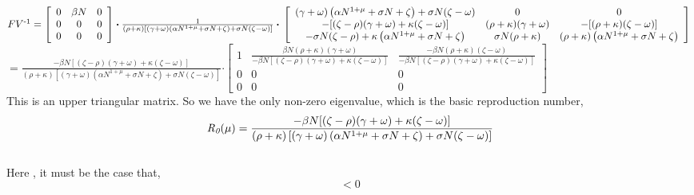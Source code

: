 $
FV\textsuperscript{-1} = \left[\begin{array}{ccc}
0 & \beta N & 0 \\
0 & 0 & 0 \\
0 & 0 & 0
\end{array}\right] \boldsymbol{\cdot} \frac{1}{(\rho+\kappa)\left[(\gamma+\omega)\left(\alpha N^{1+\mu}+\sigma N+\zeta\right)+\sigma N(\zeta-\omega)\right]}  \boldsymbol{\cdot} \\
\\
\left[\begin{array}{ccc}
(\gamma+\omega)\left(\alpha N^{1+\mu}+\sigma N+\zeta\right)+\sigma N(\zeta-\omega) & 0 & 0 \\
-[(\zeta-\rho)(\gamma+\omega)+\kappa(\zeta-\omega)] & (\rho+\kappa)(\gamma+\omega) & -[(\rho+\kappa)(\zeta-\omega)] \\
-\sigma N(\zeta-\rho)+\kappa\left(\alpha N^{1+\mu}+\sigma N+\zeta\right) & \sigma N(\rho+\kappa) & (\rho+\kappa)\left(\alpha N^{1+\mu}+\sigma N+\zeta\right)
\end{array}\right] \\
\\
$
$
= \frac{-\beta N[(\zeta-\rho)(\gamma+\omega)+\kappa(\zeta-\omega)]}{(\rho+\kappa)\left[(\gamma+\omega)\left(\alpha N^{1+\mu}+\sigma N+\zeta\right)+\sigma N(\zeta-\omega)\right]} \boldsymbol{\cdot} \left[\begin{array}{ccc}
1 & \frac{\beta N(\rho+\kappa)(\gamma+\omega)}{-\beta N[(\zeta-\rho)(\gamma+\omega)+\kappa(\zeta-\omega)]} & \frac{-\beta N(\rho+\kappa)(\zeta-\omega)}{-\beta N[(\zeta-\rho)(\gamma+\omega)+\kappa(\zeta-\omega)]} \\
0 & 0 & 0 \\
0 & 0 & 0
\end{array}\right]
$
\\

This is an upper triangular matrix. So we have the only non-zero eigenvalue, which is the basic reproduction number, \\

\begin{equation}
\textit{R\textsubscript{0}}(\mu) = \frac{-\beta N[(\zeta-\rho)(\gamma+\omega)+\kappa(\zeta-\omega)]}{(\rho+\kappa)\left[(\gamma+\omega)\left(\alpha N^{1+\mu}+\sigma N+\zeta\right)+\sigma N(\zeta-\omega)\right]}
\end{equation} \\

Here , it must be the case that, \\
\begin{equation}
[(\zeta-\rho)(\gamma+\omega)+\kappa(\zeta-\omega)] < 0
\end{equation}\\

